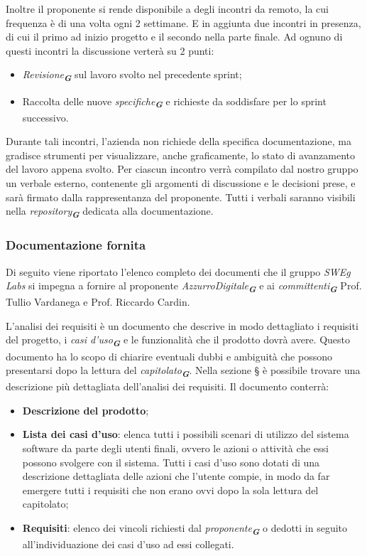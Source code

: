 Inoltre il proponente si rende disponibile a degli incontri da remoto, la cui frequenza è di una volta ogni 2 settimane.
E in aggiunta due incontri in presenza, di cui il primo ad inizio progetto e il secondo nella parte finale.
Ad ognuno di questi incontri la discussione verterà su 2 punti:
\begin{itemize}
    \item \emph{Revisione}\textsubscript{\textit{\textbf{G}}} sul lavoro svolto nel precedente sprint;
    \item Raccolta delle nuove \emph{specifiche}\textsubscript{\textit{\textbf{G}}} e richieste da soddisfare per lo sprint successivo.
\end{itemize}
Durante tali incontri, l’azienda non richiede della specifica documentazione, ma gradisce strumenti per visualizzare, anche graficamente, lo stato di avanzamento del lavoro appena svolto.
Per ciascun incontro verrà compilato dal nostro gruppo un verbale esterno, contenente gli argomenti di discussione e le decisioni prese, e sarà firmato dalla rappresentanza del proponente.
Tutti i verbali saranno visibili nella \emph{repository}\textsubscript{\textit{\textbf{G}}} dedicata alla documentazione.

\subsubsection{Documentazione fornita}
\label{sec:documentazione_fornita}
Di seguito viene riportato l'elenco completo dei documenti che il gruppo \emph{SWEg Labs} si impegna a fornire al proponente \emph{AzzurroDigitale}\textsubscript{\textit{\textbf{G}}}
e ai \emph{committenti}\textsubscript{\textit{\textbf{G}}} Prof. Tullio Vardanega e Prof. Riccardo Cardin.

L'analisi dei requisiti è un documento che descrive in modo dettagliato i requisiti del progetto, i \emph{casi d'uso}\textsubscript{\textit{\textbf{G}}} e le funzionalità che il prodotto dovrà avere. 
Questo documento ha lo scopo di chiarire eventuali dubbi e ambiguità che possono presentarsi dopo la lettura del \emph{capitolato}\textsubscript{\textit{\textbf{G}}}.
Nella sezione \S{} è possibile trovare una descrizione più dettagliata dell'analisi dei requisiti.
Il documento conterrà:
\begin{itemize}
    \item \textbf{Descrizione del prodotto};
    \item \textbf{Lista dei casi d'uso}: elenca tutti i possibili scenari di utilizzo del sistema software
    da parte degli utenti finali, ovvero le azioni o attività che essi possono svolgere con il
    sistema. Tutti i casi d’uso sono dotati di una descrizione dettagliata delle azioni che
    l’utente compie, in modo da far emergere tutti i requisiti che non erano ovvi dopo la
    sola lettura del capitolato;
    \item \textbf{Requisiti}: elenco dei vincoli richiesti dal \emph{proponente}\textsubscript{\textit{\textbf{G}}} o dedotti in seguito all'individuazione dei casi d'uso ad essi collegati.
\end{itemize}

